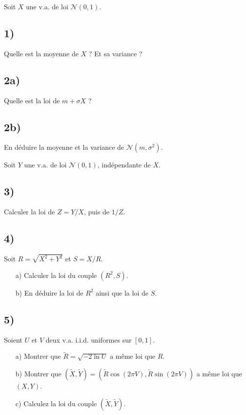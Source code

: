 \documentclass[12pt,a4paper]{article}
\begin{document}
Soit $X$ une v.a. de loi $\mathcal{N}(0,1)$.  

\subsection*{1)} Quelle est la moyenne de $X$ ? Et sa variance ?  

\subsection*{2a)} Quelle est la loi de $m + \sigma X$ ?  

\subsection*{2b)} En déduire la moyenne et la variance de $\mathcal{N}(m,\sigma^2)$.  

Soit $Y$ une v.a. de loi $\mathcal{N}(0,1)$, indépendante de $X$.  

\subsection*{3)} Calculer la loi de $Z = Y/X$, puis de $1/Z$.  

\subsection*{4)} Soit $R = \sqrt{X^2 + Y^2}$ et $S = X/R$.  

\begin{itemize}
    \item[a)] Calculer la loi du couple $(R^2,S)$.  
    \item[b)] En déduire la loi de $R^2$ ainsi que la loi de $S$.  
\end{itemize}

\subsection*{5)} Soient $U$ et $V$ deux v.a. i.i.d. uniformes sur $[0,1]$.  
\begin{itemize}
    \item[a)] Montrer que $\tilde{R} = \sqrt{-2\ln U}$ a même loi que $R$.  
    \item[b)] Montrer que $(\tilde{X},\tilde{Y}) = (\tilde{R}\cos(2\pi V), \tilde{R}\sin(2\pi V))$ a même loi que $(X,Y)$.  
    \item[c)] Calculez la loi du couple $(\tilde{X},\tilde{Y})$.  
\end{itemize}
\end{document}
